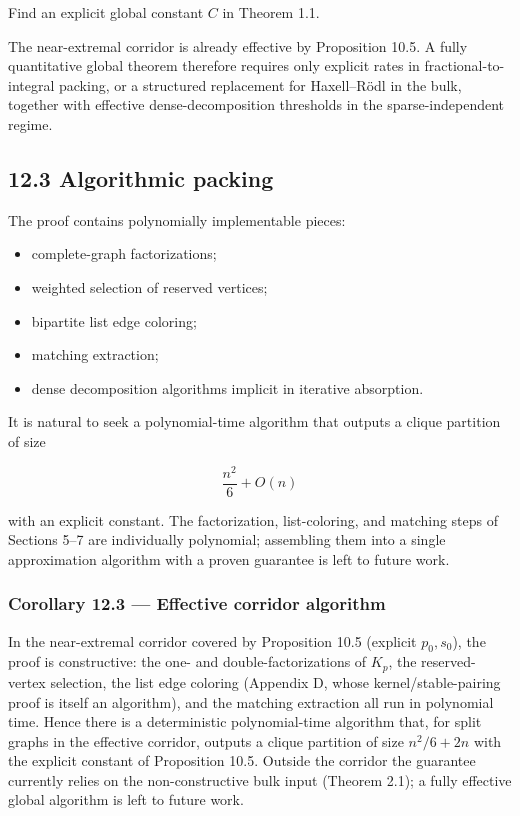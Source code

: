 \documentclass[
  11pt,
]{article}
\providecommand{\tightlist}{%
  \setlength{\itemsep}{0pt}\setlength{\parskip}{0pt}}
\begin{document}
Find an explicit global constant \(C\) in Theorem 1.1.

The near-extremal corridor is already effective by Proposition 10.5. A
fully quantitative global theorem therefore requires only explicit rates
in fractional-to-integral packing, or a structured replacement for
Haxell--Rödl in the bulk, together with effective dense-decomposition
thresholds in the sparse-independent regime.

\subsection{12.3 Algorithmic packing}\label{algorithmic-packing}

The proof contains polynomially implementable pieces:

\begin{itemize}
\tightlist
\item
  complete-graph factorizations;
\item
  weighted selection of reserved vertices;
\item
  bipartite list edge coloring;
\item
  matching extraction;
\item
  dense decomposition algorithms implicit in iterative absorption.
\end{itemize}

It is natural to seek a polynomial-time algorithm that outputs a clique
partition of size

\[
\frac{n^2}{6}+O(n)
\]

with an explicit constant. The factorization, list-coloring, and
matching steps of Sections 5--7 are individually polynomial; assembling
them into a single approximation algorithm with a proven guarantee is
left to future work.

\subsubsection{Corollary 12.3 --- Effective corridor
algorithm}\label{corollary-12.3-effective-corridor-algorithm}

In the near-extremal corridor covered by Proposition 10.5 (explicit
\(p_0,s_0\)), the proof is constructive: the one- and
double-factorizations of \(K_p\), the reserved-vertex selection, the
list edge coloring (Appendix D, whose kernel/stable-pairing proof is
itself an algorithm), and the matching extraction all run in polynomial
time. Hence there is a deterministic polynomial-time algorithm that, for
split graphs in the effective corridor, outputs a clique partition of
size \(n^2/6+2n\) with the explicit constant of Proposition 10.5.
Outside the corridor the guarantee currently relies on the
non-constructive bulk input (Theorem 2.1); a fully effective global
algorithm is left to future work.
\end{document}
